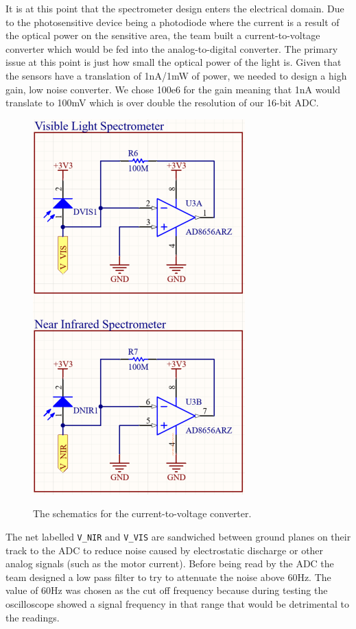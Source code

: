 \documentclass[journal]{IEEEtran}
\begin{document}
It is at this point that the spectrometer design enters the electrical domain. Due to the
photosensitive device being a photodiode where the current is a result of the optical power on the
sensitive area, the team built a current-to-voltage converter which would be fed into the
analog-to-digital converter. The primary issue at this point is just how small the optical power of
the light is. Given that the sensors have a translation of 1nA/1mW of power, we needed to design a
high gain, low noise converter. We chose 100e6 for the gain meaning that 1nA would translate to
100mV which is over double the resolution of our 16-bit ADC.
\begin{figure}[H]
    \centering
    \includegraphics[height=.25\textheight]{images/SensorSchematics.PNG}
    \label{fig:sensor-schematic}
    \caption{The schematics for the current-to-voltage converter.}
\end{figure}
The net labelled \verb|V_NIR| and \verb|V_VIS| are sandwiched between ground planes on their track
to the ADC to reduce noise caused by electrostatic discharge or other analog signals (such as the
motor current). Before being read by the ADC the team designed a low pass filter to try to attenuate
the noise above 60Hz. The value of 60Hz was chosen as the cut off frequency because during
testing the oscilloscope showed a signal frequency in that range that would be detrimental to the
readings.
\end{document}
